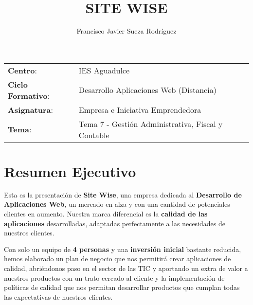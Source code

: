 


\title{
\vspace{10ex}
\normalfont \normalsize
\Huge  \textbf{SITE WISE}
}
\author{Francisco Javier Sueza Rodríguez}



\maketitle

\thispagestyle{empty}


\vspace{73ex}

\begin{center}
    \begin{tabular}{l l}
        \textbf{Centro}: & IES Aguadulce \\
        \textbf{Ciclo Formativo}: & Desarrollo Aplicaciones Web (Distancia)\\
        \textbf{Asignatura}: & Empresa e Iniciativa Emprendedora\\
        \textbf{Tema}: & Tema 7 - Gestión Administrativa, Fiscal y Contable\\
    \end{tabular}
\end{center}

\newpage

\tableofcontents

\newpage

\section{Resumen Ejecutivo}
Esta es la presentación de \textbf{Site Wise}, una empresa dedicada al \textbf{Desarrollo de Aplicaciones Web}, un mercado en alza y con una cantidad de potenciales clientes en aumento. Nuestra marca diferencial es la \textbf{calidad de las aplicaciones} desarrolladas, adaptadas perfectamente a las necesidades de nuestros clientes.

Con solo un equipo de \textbf{4 personas} y una \textbf{inversión inicial} bastante reducida, hemos elaborado un plan de negocio que nos permitirá crear aplicaciones de calidad, abriéndonos paso en el sector de las TIC y aportando un extra de valor a nuestros productos con un trato cercado al cliente y la implementación de políticas de calidad que nos permitan desarrollar productos que cumplan todas las expectativas de nuestros clientes.

